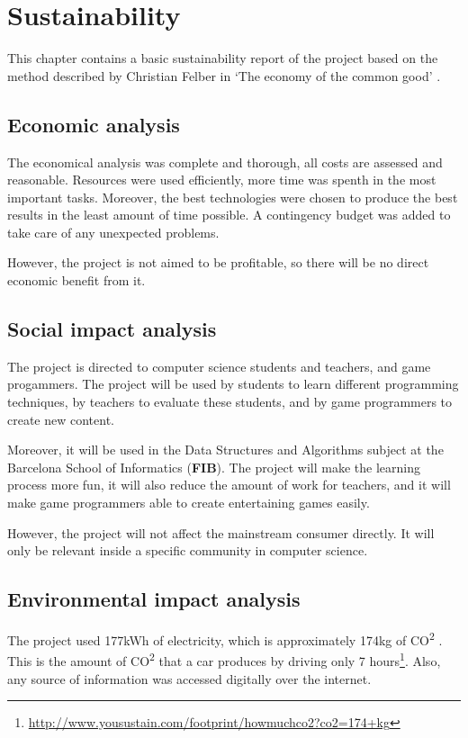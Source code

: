 \documentclass[a4paper,11pt,titlepage,abstract,numbers=noenddot,automark,mnsy,intlimits,rgb,dvipsnames]{report}
\begin{document}
\chapter{Sustainability}
This chapter contains a basic sustainability report of the project based on the method described by
Christian Felber in `The economy of the common good' \cite{sustainability_report}.
\section{Economic analysis}
The economical analysis was complete and thorough, all costs are assessed and reasonable.
Resources were used efficiently, more time was spenth in the most important tasks. Moreover, the best technologies
were chosen to produce the best results in the least amount of time possible. A contingency budget was added
to take care of any unexpected problems.

However, the project is not aimed to be profitable, so there will be no direct economic benefit from it.
\section{Social impact analysis}
The project is directed to computer science students and teachers, and game progammers. The project
will be used by students to learn different programming techniques, by teachers to evaluate these students, and
by game programmers to create new content.

Moreover, it will be used in the Data Structures and Algorithms subject
at the Barcelona School of Informatics (\textbf{FIB}). The project will make the learning process more fun, it will also
reduce the amount of work for teachers, and it will make game programmers able to create entertaining games easily.

However, the project will not affect the mainstream consumer directly. It will only be relevant inside a specific
community in computer science.
\section{Environmental impact analysis}
The project used 177kWh of electricity, which is approximately 174kg of CO\textsuperscript{2} \cite{co2}.
This is the amount of CO\textsuperscript{2} that a car produces by driving only 7
hours\footnote{\url{http://www.yousustain.com/footprint/howmuchco2?co2=174+kg}}. Also, any source of
information was accessed digitally over the internet.
\end{document}
